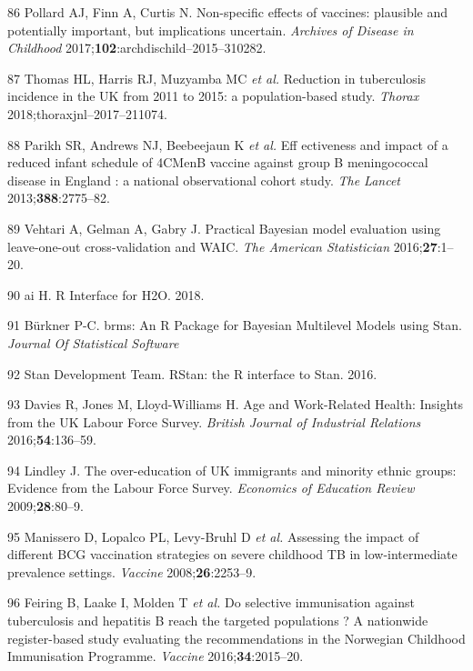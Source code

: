 \documentclass[11pt,twoside]{bristolthesis}
\begin{document}
  \leavevmode\hypertarget{ref-Pollard2017}{}%
  86 Pollard AJ, Finn A, Curtis N. Non-specific effects of vaccines: plausible and potentially important, but implications uncertain. \emph{Archives of Disease in Childhood} 2017;\textbf{102}:archdischild--2015--310282.
  
  \leavevmode\hypertarget{ref-Thomas2018}{}%
  87 Thomas HL, Harris RJ, Muzyamba MC \emph{et al.} Reduction in tuberculosis incidence in the UK from 2011 to 2015: a population-based study. \emph{Thorax} 2018;thoraxjnl--2017--211074.
  
  \leavevmode\hypertarget{ref-Parikh2016a}{}%
  88 Parikh SR, Andrews NJ, Beebeejaun K \emph{et al.} Eff ectiveness and impact of a reduced infant schedule of 4CMenB vaccine against group B meningococcal disease in England : a national observational cohort study. \emph{The Lancet} 2013;\textbf{388}:2775--82.
  
  \leavevmode\hypertarget{ref-Vehtari2016}{}%
  89 Vehtari A, Gelman A, Gabry J. Practical Bayesian model evaluation using leave-one-out cross-validation and WAIC. \emph{The American Statistician} 2016;\textbf{27}:1--20.
  
  \leavevmode\hypertarget{ref-h2o2018}{}%
  90 ai H. R Interface for H2O. 2018.
  
  \leavevmode\hypertarget{ref-Burkner}{}%
  91 Bürkner P-C. brms: An R Package for Bayesian Multilevel Models using Stan. \emph{Journal Of Statistical Software}
  
  \leavevmode\hypertarget{ref-StanDevelopmentTeam2016}{}%
  92 Stan Development Team. RStan: the R interface to Stan. 2016.
  
  \leavevmode\hypertarget{ref-Davies2016a}{}%
  93 Davies R, Jones M, Lloyd-Williams H. Age and Work-Related Health: Insights from the UK Labour Force Survey. \emph{British Journal of Industrial Relations} 2016;\textbf{54}:136--59.
  
  \leavevmode\hypertarget{ref-Lindley2009}{}%
  94 Lindley J. The over-education of UK immigrants and minority ethnic groups: Evidence from the Labour Force Survey. \emph{Economics of Education Review} 2009;\textbf{28}:80--9.
  
  \leavevmode\hypertarget{ref-Manissero2008}{}%
  95 Manissero D, Lopalco PL, Levy-Bruhl D \emph{et al.} Assessing the impact of different BCG vaccination strategies on severe childhood TB in low-intermediate prevalence settings. \emph{Vaccine} 2008;\textbf{26}:2253--9.
  
  \leavevmode\hypertarget{ref-Feiring2016}{}%
  96 Feiring B, Laake I, Molden T \emph{et al.} Do selective immunisation against tuberculosis and hepatitis B reach the targeted populations ? A nationwide register-based study evaluating the recommendations in the Norwegian Childhood Immunisation Programme. \emph{Vaccine} 2016;\textbf{34}:2015--20.
  
\end{document}
